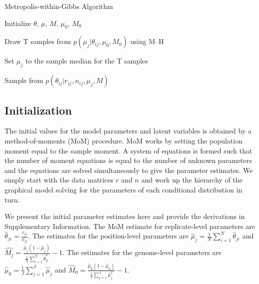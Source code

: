 \documentclass{bioinfo}
\begin{document}
\begin{algorithm}[ht]
  \caption{Metropolis-within-Gibbs Algorithm}
  \label{alg:metro_gibbs}
  \begin{algorithmic}[1]

  \State Initialize $\theta$, $\mu$, $M$, $\mu_0$, $M_0$

  \Repeat


    \State Draw T samples from $p \left( \mu_j |\theta_{ij},\mu_0,M_0\right)$ using M--H 

    \State Set $\mu_j$ to the sample median for the T samples


	\State Sample from $p \left( \theta_{ij} |r_{ij},n_{ij},\mu_j,M \right)$
	
      \EndFor

    \EndFor


  \end{algorithmic}
\end{algorithm}


\subsection{Initialization}
The initial values for the model parameters and latent variables is obtained by a method-of-moments (MoM) procedure. MoM works by setting the population moment equal to the sample moment. A system of equations is formed such that the number of moment equations is equal to the number of unknown parameters and the equations are solved simultaneously to give the parameter estimates. We simply start with the data matrices $r$ and $n$ and work up the hierarchy of the graphical model solving for the parameters of each conditional distribution in turn.

We present the initial parameter estimates here and provide the derivations in Supplementary Information. The MoM estimate for replicate-level parameters are
$\hat{\theta}_{ji} = \frac{r_{ji}} {n_{ji}}$.
The estimates for the position-level parameters are
$\hat{\mu}_j = \frac{1}{N} \sum_{i=1}^N \hat{\theta}_{ji}$
and
$\hat{M_j} = \frac{ \hat{\mu}_j (1 - \hat{\mu}_j ) } { \frac{1}{N} \sum_{i=1}^N \hat{\theta}_{ji}^2 } -1$.
The estimates for the genome-level parameters are
$\hat{\mu}_0 = \frac{1}{J} \sum_{j=1}^J \hat{\mu}_j$
and
$\hat{M}_0 = \frac{ \hat{\mu}_0 (1 - \hat{\mu}_0 ) } {\frac{1}{J} \sum_{j=1}^J \hat{\mu}_j^2 } -1$.
\end{document}
